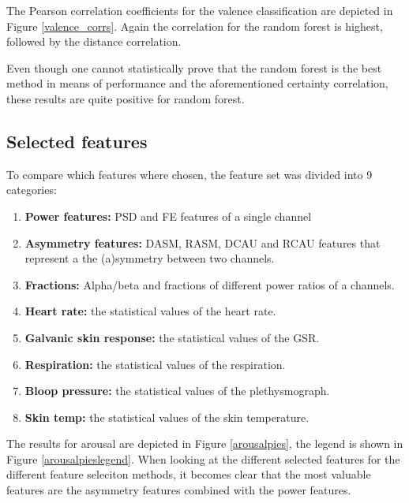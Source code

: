 The Pearson correlation coefficients for the valence classification are depicted in Figure \ref{valence_corrs}. Again the correlation for the random forest is highest, followed by the distance correlation.


Even though one cannot statistically prove that the random forest is the best method in means of performance and the aforementioned certainty correlation, these results are quite positive for random forest. 

\subsection{Selected features}

To compare which features where chosen, the feature set was divided into 9 categories:
\begin{enumerate}
\item \textbf{Power features:} PSD and FE features of a single channel
\item \textbf{Asymmetry features:} DASM, RASM, DCAU and RCAU features that represent a the (a)symmetry between two channels.
\item \textbf{Fractions:} Alpha/beta and fractions of different power ratios of a channels.

\item \textbf{Heart rate:} the statistical values of the heart rate.
\item \textbf{Galvanic skin response:} the statistical values of the GSR.
\item \textbf{Respiration:} the statistical values of the respiration.
\item \textbf{Bloop pressure:} the statistical values of the plethysmograph.
\item \textbf{Skin temp:} the statistical values of the skin temperature.
\end{enumerate} 

The results for arousal are depicted in Figure \ref{arousalpies}, the legend is shown in Figure \ref{arousalpieslegend}. When looking at the different selected features for the different feature seleciton methods, it becomes clear that the most valuable features are the asymmetry features combined with the power features.

\npar


